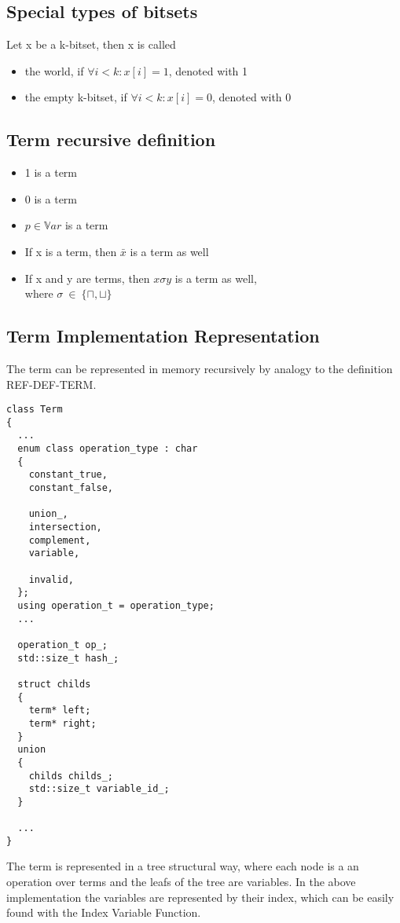\documentclass{article}
\begin{document}
	\subsection*{Special types of bitsets}
		Let x be a k-bitset, then x is called
		\begin{itemize}
			\item the world, if $\forall i<k : x[i] = 1$, denoted with 1
			\item the empty k-bitset, if $\forall i<k : x[i] = 0$, denoted with 0
		\end{itemize}
	\subsection*{Term recursive definition}
	\begin{itemize}
		\item 1 is a term
		\item 0 is a term
		\item $p \in \mathbb{V}ar$ is a term
		\item If x is a term, then $\bar{x}$ is a term as well
		\item If x and y are terms, then $x \sigma y $ is a term as well,\\
			where $\sigma \: \in \: \{\sqcap, \sqcup\}$
	\end{itemize}	

	\subsection*{Term Implementation Representation}
		The term can be represented in memory recursively by analogy to the definition REF-DEF-TERM.

	\begin{lstlisting}
class Term 
{
  ...
  enum class operation_type : char
  {
    constant_true,
    constant_false,

    union_,
    intersection,
    complement,
    variable,

    invalid,
  };
  using operation_t = operation_type;
  ...

  operation_t op_;
  std::size_t hash_;
  
  struct childs
  {
    term* left;
    term* right;
  }
  union 
  {
    childs childs_;
    std::size_t variable_id_;
  }

  ...
}
	\end{lstlisting}
	The term is represented in a tree structural way, where each node is a an operation over terms and the leafs of the tree
	are variables. In the above implementation the variables are represented by their index, which can be 
	easily found with the Index Variable Function. 
\end{document}
